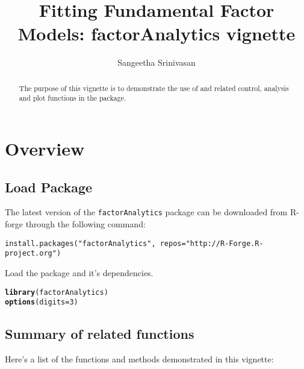\documentclass[a4paper]{article}\usepackage[]{graphicx}\usepackage[]{color}
\makeatletter
\newcommand{\hlnum}[1]{\textcolor[rgb]{0.686,0.059,0.569}{#1}}%
\newcommand{\hlstd}[1]{\textcolor[rgb]{0.345,0.345,0.345}{#1}}%
\newcommand{\hlkwc}[1]{\textcolor[rgb]{0.333,0.667,0.333}{#1}}%
\newcommand{\hlkwd}[1]{\textcolor[rgb]{0.737,0.353,0.396}{\textbf{#1}}}%
\newenvironment{kframe}{%
 \def\at@end@of@kframe{}%
 \ifinner\ifhmode%
  \def\at@end@of@kframe{\end{minipage}}%
  \begin{minipage}{\columnwidth}%
 \fi\fi%
 \def\FrameCommand##1{\hskip\@totalleftmargin \hskip-\fboxsep
 \colorbox{shadecolor}{##1}\hskip-\fboxsep
     \hskip-\linewidth \hskip-\@totalleftmargin \hskip\columnwidth}%
 \MakeFramed {\advance\hsize-\width
   \@totalleftmargin\z@ \linewidth\hsize
   \@setminipage}}%
 {\par\unskip\endMakeFramed%
 \at@end@of@kframe}
\newenvironment{knitrout}{}{} %
\makeatother
\begin{document}
\title{Fitting Fundamental Factor Models: factorAnalytics vignette}
\author{Sangeetha Srinivasan}
\maketitle

\begin{abstract}
The purpose of this vignette is to demonstrate the use of  and related control, analysis and plot functions in the  package.
\end{abstract}

\tableofcontents
\bigskip

\newpage
\section{Overview}

\subsection{Load Package}

The latest version of the \verb"factorAnalytics" package can be downloaded from R-forge through the following command:
\begin{verbatim}
install.packages("factorAnalytics", repos="http://R-Forge.R-project.org")
\end{verbatim}
Load the package and it's dependencies.
\begin{knitrout}
\color{fgcolor}\begin{kframe}
\begin{alltt}
\hlkwd{library}\hlstd{(factorAnalytics)}
\hlkwd{options}\hlstd{(}\hlkwc{digits}\hlstd{=}\hlnum{3}\hlstd{)}
\end{alltt}
\end{kframe}
\end{knitrout}

\subsection{Summary of related functions}
Here's a list of the functions and methods demonstrated in this vignette:
\end{document}
